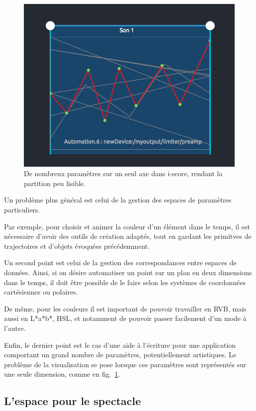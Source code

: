 \documentclass[french,12pt]{article}
\begin{document}
\begin{figure}[h]
\centering
\includegraphics[scale=0.5]{images/iscore.png}
\caption{De nombreux paramètres sur un seul axe dans i-score, rendant la partition peu lisible.}
\label{fig.iscore}
\end{figure}

Un problème plus général est celui de la gestion des espaces de paramètres particuliers.

Par exemple, pour choisir et animer la couleur d'un élément dans le temps, il est nécessaire d'avoir des outils de création adaptés, tout en gardant les primitves de trajectoires et d'objets évoquées précédemment.

Un second point est celui de la gestion des correspondances entre espaces de données. Ainsi, si on désire automatiser un point sur un plan en deux dimensions dans le temps, il doit être possible de le faire selon les systèmes de coordonnées cartésiennes ou polaires.

De même, pour les couleurs il est important de pouvoir travailler en RVB, mais aussi en L*a*b*, HSL, et notamment de pouvoir passer facilement d'un mode à l'autre.

Enfin, le dernier point est le cas d'une aide à l'écriture pour une application comportant un grand nombre de paramètres, potentiellement artistiques. Le problème de la visualisation se pose lorsque ces paramètres sont représentés sur une seule dimension, comme en fig.~\ref{fig.iscore}.

\subsection{L'espace pour le spectacle}
\end{document}
